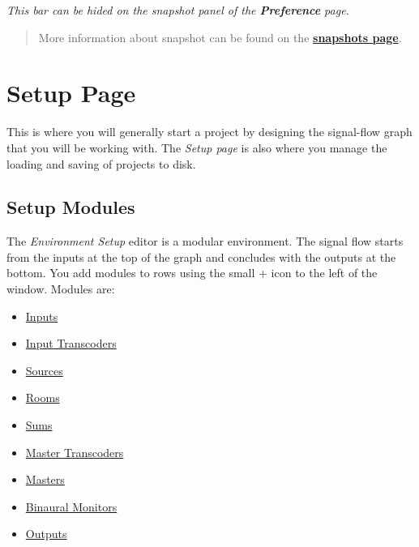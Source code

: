 \documentclass[
  letterpaper,
  DIV=11,
  numbers=noendperiod]{scrreport}
\providecommand{\tightlist}{%
  \setlength{\itemsep}{0pt}\setlength{\parskip}{0pt}}\usepackage{longtable,booktabs,array}
\begin{document}
\emph{This bar can be hided on the snapshot panel of the
\textbf{Preference} page.}

\begin{quote}
More information about snapshot can be found on the
\textbf{\href{Spat_Environment_Snapshot_Page.md}{snapshots page}}.
\end{quote}

\hypertarget{setup-page}{%
\chapter{Setup Page}\label{setup-page}}

This is where you will generally start a project by designing the
signal-flow graph that you will be working with. The \emph{Setup page}
is also where you manage the loading and saving of projects to disk.

\hypertarget{setup-modules}{%
\section{Setup Modules}\label{setup-modules}}

The \emph{Environment Setup} editor is a modular environment. The signal
flow starts from the inputs at the top of the graph and concludes with
the outputs at the bottom. You add modules to rows using the small +
icon to the left of the window. Modules are:

\begin{itemize}
\tightlist
\item
  \href{Spat_Environment_Input_Modules.md}{Inputs}
\item
  \href{Spat_Environment_Input_Transcoder_Modules.md}{Input Transcoders}
\item
  \href{Spat_Environment_Source_Room_Modules.md}{Sources}
\item
  \href{Spat_Environment_Source_Room_Modules.md}{Rooms}
\item
  \href{Spat_Environment_Master_Section_Modules.md}{Sums}
\item
  \href{Spat_Environment_Master_Section_Modules.md}{Master Transcoders}
\item
  \href{Spat_Environment_Master_Section_Modules.md}{Masters}
\item
  \href{Spat_Environment_Master_Section_Modules.md}{Binaural Monitors}
\item
  \href{Spat_Environment_Output_Modules.md}{Outputs}
\end{itemize}
\end{document}

